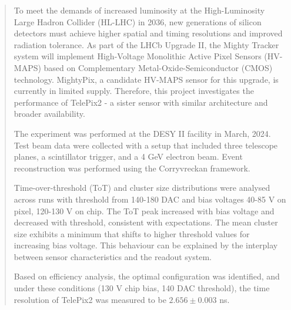 \begin{abstract}

To meet the demands of increased luminosity at the High-Luminosity Large Hadron Collider (HL-LHC) in 2036, new generations of silicon detectors must achieve higher spatial and timing resolutions and improved radiation tolerance. As part of the LHCb Upgrade II, the Mighty Tracker system will implement High-Voltage Monolithic Active Pixel Sensors (HV-MAPS) based on Complementary Metal-Oxide-Semiconductor (CMOS) technology. MightyPix, a candidate HV-MAPS sensor for this upgrade, is currently in limited supply. Therefore, this project investigates the performance of TelePix2 - a sister sensor with similar architecture and broader availability.

The experiment was performed at the DESY II facility in March, 2024. Test beam data were collected with a setup that included three telescope planes, a scintillator trigger, and a 4 GeV electron beam. Event reconstruction was performed using the Corryvreckan framework.

Time-over-threshold (ToT) and cluster size distributions were analysed across runs with threshold from 140-180 DAC and bias voltages 40-85 V on pixel, 120-130 V on chip. The ToT peak increased with bias voltage and decreased with threshold, consistent with expectations. The mean cluster size exhibits a minimum that shifts to higher threshold values for increasing bias voltage. This behaviour can be explained by the interplay between sensor characteristics and the readout system.

Based on efficiency analysis, the optimal configuration was identified, and under these conditions (130 V chip bias, 140 DAC threshold), the time resolution of TelePix2 was measured to be $2.656 \pm 0.003$ ns.

\end{abstract}






